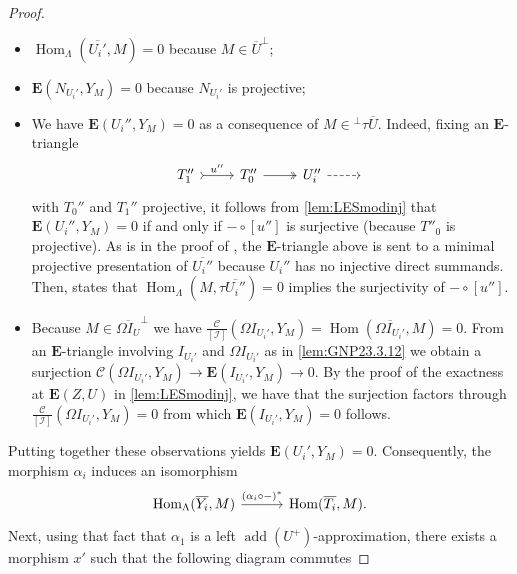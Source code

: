 \documentclass[10pt,twoside, a4paper,reqno]{amsart}
\DeclareMathOperator{\Hom}{Hom}
\DeclareMathOperator{\add}{add}
\newcommand{\calI}{\mathcal{I}}
\newcommand{\calC}{\mathcal{C}}
\newcommand{\E}{\mathbf{E}}
\theoremstyle{definition}
\begin{document}
\begin{proof}
       \begin{itemize}
       		\item $ \Hom_{\Lambda}(\overline{U_i'}, M) = 0$ because $M \in \overline{U}^\perp$;
		\item $\E(N_{U_i'}, Y_M) = 0$ because $N_{U_i'}$ is projective;
		\item We have $\E(U_i'', Y_M) = 0 $ as a consequence of $M \in {}^\perp \tau \overline{U}$. Indeed, fixing an $\E$-triangle
        \begin{equation*}
            \begin{tikzcd}
      	     {T_1''}  \arrow[r,tail,"{u''}"] & {T_0''}  \arrow[r,two heads] & {U_i''} \arrow[r,dashed] & {}
	       \end{tikzcd}
        \end{equation*}
        with $T_0''$ and $T_1''$ projective, it follows from \cref{lem:LESmodinj} that $\E(U_i'', Y_M) = 0$ if and only if $-\circ [u'']$ is surjective (because $T''_0$ is projective). As is in the proof of \cite[Prop. 4.5]{PZ24}, the $\E$-triangle above is sent to a minimal projective presentation of $\overline{U_i''}$ because $U_i''$ has no injective direct summands. Then, \cite[Prop. 2.4]{AIR2014} states that $\Hom_{\Lambda}(M,\tau \overline{U_i''}) = 0$ implies the surjectivity of $-\circ [u'']$.
		\item Because $M \in \overline{\Omega I_U}^\perp$ we have $\frac{\calC}{[\calI]}(\Omega I_{U_i'}, Y_M) = \Hom(\overline{\Omega I_{U_i'}}, M) = 0$. From an $\E$-triangle involving $I_{U_i'}$ and $\Omega I_{U_i'}$ as in \cref{lem:GNP23.3.12} we obtain a surjection $\calC( \Omega I_{U_i'}, Y_M) \to \E(I_{U_i'}, Y_M) \to 0$. By the proof of the exactness at $\E(Z,U)$ in \cref{lem:LESmodinj}, we have that the surjection factors through $\frac{\calC}{[\calI]}(\Omega I_{U_i'}, Y_M) =0$ from which $\E(I_{U_i'}, Y_M)=0$ follows.
       \end{itemize}
       Putting together these observations yields $\E(U_i', Y_M) =0$. Consequently, the morphism $\alpha_i$ induces an isomorphism
      \begin{equation}\label{eq:alphainducediso}
      \begin{tikzcd}[column sep=3em]
            \Hom_{\Lambda}(\overline{Y_i},M) \arrow[r,"(\alpha_i\circ -)^\ast"] &  \Hom(\overline{T_i},M).
            \end{tikzcd}
      \end{equation}
    Next, using that fact that $\alpha_1$ {is a} left $\add(U^+)$-approximation, there exists a morphism $x'$ such that the following diagram commutes

\end{proof}
\end{document}
